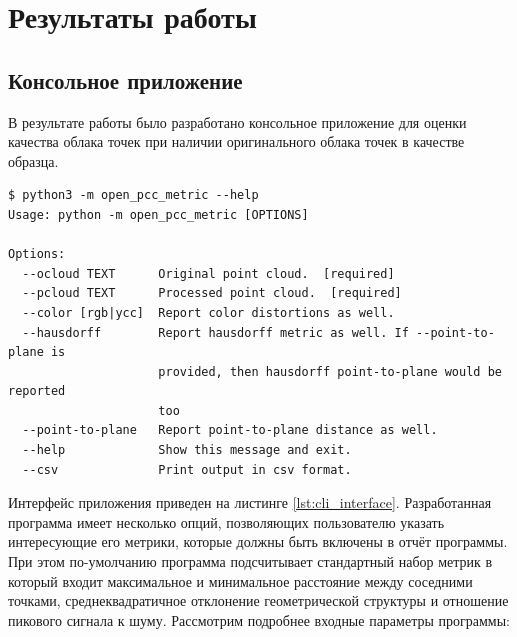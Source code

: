 

\newpage
\chapter{Результаты работы}

\section{Консольное приложение}

В результате работы было разработано консольное приложение для оценки качества
облака точек при наличии оригинального облака точек в качестве образца.

\begin{lstlisting}[caption={
    Интерфейс разработанного консольного приложения
}, basicstyle=\footnotesize, label={lst:cli_interface}]
$ python3 -m open_pcc_metric --help
Usage: python -m open_pcc_metric [OPTIONS]

Options:
  --ocloud TEXT      Original point cloud.  [required]
  --pcloud TEXT      Processed point cloud.  [required]
  --color [rgb|ycc]  Report color distortions as well.
  --hausdorff        Report hausdorff metric as well. If --point-to-plane is
                     provided, then hausdorff point-to-plane would be reported
                     too
  --point-to-plane   Report point-to-plane distance as well.
  --help             Show this message and exit.
  --csv              Print output in csv format.
\end{lstlisting}

Интерфейс приложения приведен на листинге \ref{lst:cli_interface}. Разработанная
программа имеет несколько опций, позволяющих пользователю указать интересующие
его метрики, которые должны быть включены в отчёт программы. При этом
по-умолчанию программа подсчитывает стандартный набор метрик в который входит
максимальное и минимальное расстояние между соседними точками,
среднеквадратичное отклонение геометрической структуры и отношение пикового
сигнала к шуму. Рассмотрим подробнее входные параметры программы:


